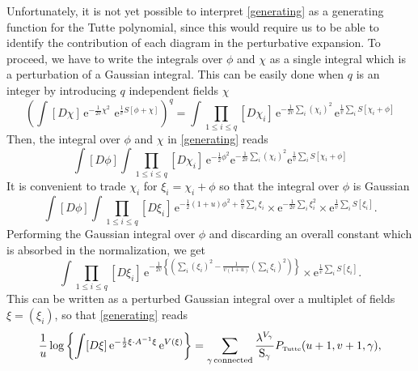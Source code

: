 \documentclass[12pt,here,feynmf]{article}
\begin{document}
Unfortunately, it is not yet possible to interpret \eqref{generating} as a generating function for the Tutte polynomial, since this would require us to be able to identify the contribution of each diagram in the  perturbative expansion. To proceed, we have to write the integrals over $\phi$ and $\chi$ as a single integral which is a perturbation of a Gaussian integral.   This can be easily done when $q$ is an integer by introducing $q$ independent fields $\chi$ 
\begin{equation}
\left(
\int[D\chi]\,\mathrm{e}^{-\frac{1}{2v}\chi^{2}}\,
\,\mathrm{e}^{\frac{1}{v}S[\phi+\chi]}
\right)^{q}
=\int \prod_{1\leq i\leq q}[D\chi_{i}]\,
\mathrm{e}^{-\frac{1}{2v}\sum_{i}(\chi_{i})^{2}}\,\mathrm{e}^{\frac{1}{v}\sum_{i}S[\chi_{i}+\phi]}
\end{equation}
Then, the integral over $\phi$ and $\chi$ in \eqref{generating} reads
\begin{equation}
\int[D\phi]\int \prod_{1\leq i\leq q}[D\chi_{i}]\,
\mathrm{e}^{-\frac{1}{2}\phi^{2}}
\mathrm{e}^{-\frac{1}{2v}\sum_{i}(\chi_{i})^{2}}\mathrm{e}^{\frac{1}{v}\sum_{i}S[\chi_{i}+\phi]}
\end{equation}
It is convenient to trade $\chi_{i}$ for $\xi_{i}=\chi_{i}+\phi$ so that the integral over $\phi$ is Gaussian 
\begin{equation}
\int [D\phi]\int \prod_{1\leq i\leq q}[D\xi_{i}]\,
\mathrm{e}^{-\frac{1}{2}\left(1+u\right)\phi^{2}
+\frac{\phi}{v}\sum_{i}\xi_{i}}
\times\mathrm{e}^{-\frac{1}{2v}\sum_{i}\xi_{i}^{2}}
\times\mathrm{e}^{\frac{1}{v}\sum_{i}S[\xi_{i}]}.
 \end{equation}
Performing the Gaussian integral over $\phi$  and discarding an overall constant which is absorbed in the normalization, we get
\begin{equation}
\int \prod_{1\leq i\leq q}[D\xi_{i}]\,
\mathrm{e}^{-\frac{1}{2v}\left\{
\left(\sum_{i}(\xi_{i})^{2}-\frac{1}{v(1+u)}\left(\sum_{i}\xi_{i}\right)^{2}\right)\right\}}
\times\mathrm{e}^{\frac{1}{v}\sum_{i}S[\xi_{i}]}.
 \end{equation}
This can be written as a perturbed Gaussian integral over a multiplet of fields $\xi=(\xi_{i})$, so that \eqref{generating} reads
\begin{equation}
\frac{1}{u}\log\left\{
\int  [D\xi]\,
\mathrm{e}^{
-\frac{1}{2}\xi\cdot A^{-1}\xi}\, \mathrm{e}^{V(\xi)}
\right\}=
\sum_{\gamma\,\mathrm{connected}}
\frac{\lambda^{V_{\gamma}}}{\mathrm{S}_{\gamma}}P_{\mbox{\tiny Tutte}}(u+1,v+1,\gamma),
\label{generating2}
\end{equation}
\end{document}
